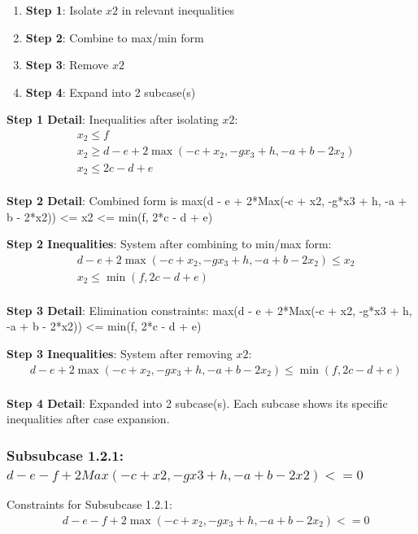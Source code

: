 \documentclass{article}
\begin{document}
\begin{enumerate}
\item \textbf{Step 1}: Isolate $x2$ in relevant inequalities
\item \textbf{Step 2}: Combine to max/min form
\item \textbf{Step 3}: Remove $x2$
\item \textbf{Step 4}: Expand into 2 subcase(s)
\end{enumerate}

\textbf{Step 1 Detail}: Inequalities after isolating $x2$:
\begin{align}
& x_{2} \leq f \\
& x_{2} \geq d - e + 2 \max\left(- c + x_{2}, - g x_{3} + h, - a + b - 2 x_{2}\right) \\
& x_{2} \leq 2 c - d + e \\
\end{align}

\textbf{Step 2 Detail}: Combined form is max(d - e + 2*Max(-c + x2, -g*x3 + h, -a + b - 2*x2)) <= x2 <= min(f, 2*c - d + e)

\textbf{Step 2 Inequalities}: System after combining to min/max form:
\begin{align}
& d - e + 2 \max\left(- c + x_{2}, - g x_{3} + h, - a + b - 2 x_{2}\right) \leq x_{2} \\
& x_{2} \leq \min\left(f, 2 c - d + e\right) \\
\end{align}

\textbf{Step 3 Detail}: Elimination constraints:
\quad max(d - e + 2*Max(-c + x2, -g*x3 + h, -a + b - 2*x2)) <= min(f, 2*c - d + e)

\textbf{Step 3 Inequalities}: System after removing $x2$:
\begin{align}
& d - e + 2 \max\left(- c + x_{2}, - g x_{3} + h, - a + b - 2 x_{2}\right) \leq \min\left(f, 2 c - d + e\right) \\
\end{align}

\textbf{Step 4 Detail}: Expanded into 2 subcase(s).
Each subcase shows its specific inequalities after case expansion.

\subsubsection{Subsubcase 1.2.1: $d - e - f + 2 Max(-c + x2, -g x3 + h, -a + b - 2 x2) <= 0$}

Constraints for Subsubcase 1.2.1:
\begin{align}
& d - e - f + 2 \max\left(- c + x_{2}, - g x_{3} + h, - a + b - 2 x_{2}\right) <= 0 \\
\end{align}
\end{document}

